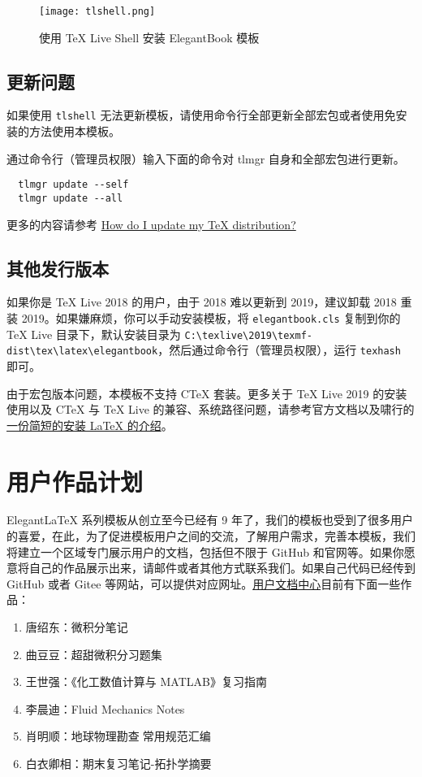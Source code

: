 \documentclass[cn,11pt]{elegantbook}
\begin{document}
\begin{figure}[htbp]
  \centering
  \texttt{[image: tlshell.png]}
  \caption{使用 \TeX{} Live Shell 安装 ElegantBook 模板}
\end{figure}

\subsection{更新问题}

如果使用 \lstinline{tlshell} 无法更新模板，请使用命令行全部更新全部宏包或者使用免安装的方法使用本模板。

通过命令行（管理员权限）输入下面的命令对 tlmgr 自身和全部宏包进行更新。

\begin{lstlisting}
  tlmgr update --self 
  tlmgr update --all
\end{lstlisting}

更多的内容请参考 \href{https://tex.stackexchange.com/questions/55437/how-do-i-update-my-tex-distribution}{How do I update my \TeX{} distribution?}

\subsection{其他发行版本}

如果你是 \TeX{} Live 2018 的用户，由于 2018 难以更新到 2019，建议卸载 2018 重装 2019。如果嫌麻烦，你可以手动安装模板，将 \lstinline{elegantbook.cls} 复制到你的 \TeX{} Live 目录下，默认安装目录为 \lstinline|C:\texlive\2019\texmf-dist\tex\latex\elegantbook|，然后通过命令行（管理员权限），运行 \lstinline{texhash} 即可。

由于宏包版本问题，本模板不支持 C\TeX{} 套装。更多关于 \TeX{} Live 2019 的安装使用以及 C\TeX{} 与 \TeX{} Live 的兼容、系统路径问题，请参考官方文档以及啸行的\href{https://github.com/OsbertWang/install_latex/releases}{一份简短的安装 \LaTeX{} 的介绍}。


\section{用户作品计划}

Elegant\LaTeX{} 系列模板从创立至今已经有 9 年了，我们的模板也受到了很多用户的喜爱，在此，为了促进模板用户之间的交流，了解用户需求，完善本模板，我们将建立一个区域专门展示用户的文档，包括但不限于 GitHub 和官网等。如果你愿意将自己的作品展示出来，请邮件或者其他方式联系我们。如果自己代码已经传到 GitHub 或者 Gitee 等网站，可以提供对应网址。\href{https://github.com/ElegantLaTeX/Archive/tree/master/Collections}{用户文档中心}目前有下面一些作品：
\begin{enumerate}
\item 唐绍东：微积分笔记
\item 曲豆豆：超甜微积分习题集
\item 王世强：《化工数值计算与 MATLAB》复习指南
\item 李晨迪：Fluid Mechanics Notes
\item 肖明顺：地球物理勘查常用规范汇编
\item 白衣卿相：期末复习笔记-拓扑学摘要
\end{enumerate}
\end{document}
